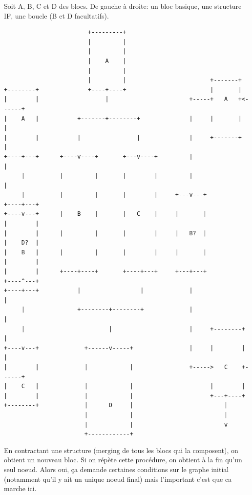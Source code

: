 \documentclass[14pt]{article}
\theoremstyle{definition}
\begin{document}
Soit A, B, C et D des blocs.
De gauche à droite: un bloc basique, une structure IF, une boucle (B et D facultatifs).
\begin{verbatim}
                        +---------+               
                        |         |               
                        |         |               
                        |    A    |               
                        |         |               
                        |         |                        +-------+            
+--------+              +----+----+                        |       |            
|        |                   |                       +-----+   A   +<------+
|    A   |           +-------+--------+              |     |       |       |    
|        |           |                |              |     +-------+       |    
+----+---+      +----v----+       +---v----+         |                     |    
     |          |         |       |        |         |                     |    
     |          |         |       |        |     +---v---+            +----+---+
+----v---+      |    B    |       |   C    |     |       |            |        |
|        |      |         |       |        |     |   B?  |            |    D?  |
|    B   |      |         |       |        |     |       |            |        |
|        |      +----+----+       +----+---+     +---+---+            +----^---+
+----+---+           |                 |             |                     |    
     |               +--------+--------+             |                     |    
     |                        |                      |     +--------+      |
+----v---+             +------v-----+                |     |        |      |    
|        |             |            |                +----->   C    +------+    
|    C   |             |            |                      |        |           
|        |             |            |                      +---+----+           
+--------+             |      D     |                          |
                       |            |                          |
                       |            |                          v
                       +------------+               
\end{verbatim}



En contractant une structure (merging de tous les blocs qui la composent), on obtient un nouveau bloc. 
Si on répète cette procédure, on obtient à la fin qu'un seul noeud.
Alors oui, ça demande certaines conditions sur le graphe initial (notamment qu'il y ait un unique noeud final) mais l'important c'est que ca marche ici.
\end{document}
